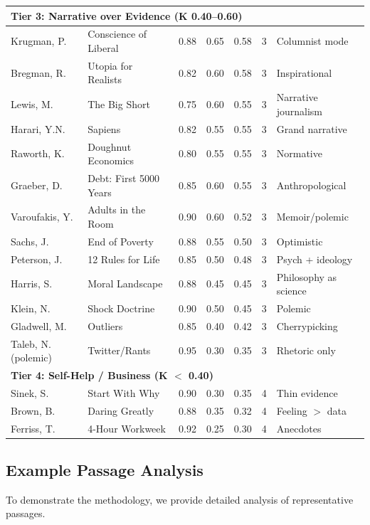 \documentclass[11pt,a4paper]{article}
\begin{document}
\begin{longtable}{p{3.5cm}p{4cm}ccccp{2cm}}
\midrule
\multicolumn{7}{l}{\textbf{Tier 3: Narrative over Evidence (K 0.40--0.60)}} \\
\midrule
Krugman, P. & Conscience of Liberal & 0.88 & 0.65 & 0.58 & 3 & Columnist mode \\
Bregman, R. & Utopia for Realists & 0.82 & 0.60 & 0.58 & 3 & Inspirational \\
Lewis, M. & The Big Short & 0.75 & 0.60 & 0.55 & 3 & Narrative journalism \\
Harari, Y.N. & Sapiens & 0.82 & 0.55 & 0.55 & 3 & Grand narrative \\
Raworth, K. & Doughnut Economics & 0.80 & 0.55 & 0.55 & 3 & Normative \\
Graeber, D. & Debt: First 5000 Years & 0.85 & 0.60 & 0.55 & 3 & Anthropological \\
Varoufakis, Y. & Adults in the Room & 0.90 & 0.60 & 0.52 & 3 & Memoir/polemic \\
Sachs, J. & End of Poverty & 0.88 & 0.55 & 0.50 & 3 & Optimistic \\
Peterson, J. & 12 Rules for Life & 0.85 & 0.50 & 0.48 & 3 & Psych + ideology \\
Harris, S. & Moral Landscape & 0.88 & 0.45 & 0.45 & 3 & Philosophy as science \\
Klein, N. & Shock Doctrine & 0.90 & 0.50 & 0.45 & 3 & Polemic \\
Gladwell, M. & Outliers & 0.85 & 0.40 & 0.42 & 3 & Cherrypicking \\
Taleb, N. (polemic) & Twitter/Rants & 0.95 & 0.30 & 0.35 & 3 & Rhetoric only \\

\midrule
\multicolumn{7}{l}{\textbf{Tier 4: Self-Help / Business (K $<$ 0.40)}} \\
\midrule
Sinek, S. & Start With Why & 0.90 & 0.30 & 0.35 & 4 & Thin evidence \\
Brown, B. & Daring Greatly & 0.88 & 0.35 & 0.32 & 4 & Feeling $>$ data \\
Ferriss, T. & 4-Hour Workweek & 0.92 & 0.25 & 0.30 & 4 & Anecdotes \\

\end{longtable}

\subsection{Example Passage Analysis}

To demonstrate the methodology, we provide detailed analysis of representative passages.
\end{document}
